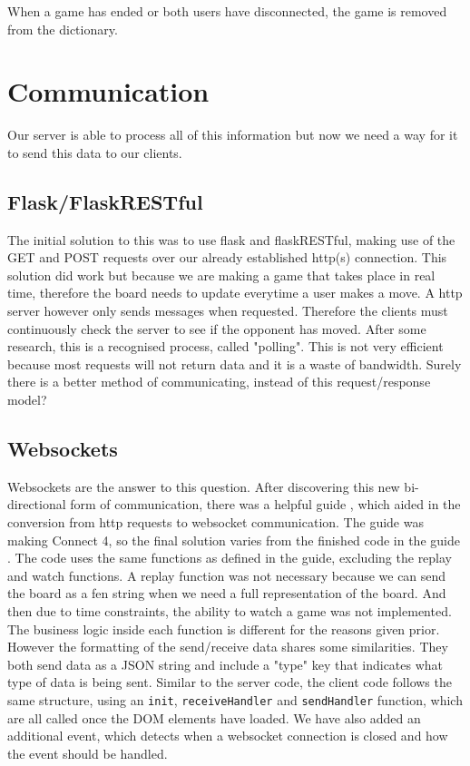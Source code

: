 When a game has ended or both users have disconnected, the game is removed from the dictionary.

\section{Communication}


Our server is able to process all of this information but now we need a way for it to send this data to our clients.

\subsection{Flask/FlaskRESTful}

The initial solution to this was to use flask and flaskRESTful, making use of the GET and POST requests over our already established http(s) connection. This solution did work but because we are making a game that takes place in real time, therefore the board needs to update everytime a user makes a move. A http server however only sends messages when requested. Therefore the clients must continuously check the server to see if the opponent has moved. After some research, this is a recognised process, called "polling". This is not very efficient because most requests will not return data and it is a waste of bandwidth. Surely there is a better method of communicating, instead of this request/response model?

\subsection{Websockets}

Websockets are the answer to this question. After discovering this new bi-directional form of communication, there was a helpful guide \cite{Websockets}, which aided in the conversion from http requests to websocket communication. The guide was making Connect 4, so the final solution varies from the finished code in the guide \cite{CompleteCode}. The code uses the same functions as defined in the guide, excluding the replay and watch functions. A replay function was not necessary because we can send the board as a fen string when we need a full representation of the board. And then due to time constraints, the ability to watch a game was not implemented. The business logic inside each function is different for the reasons given prior. However the formatting of the send/receive data shares some similarities. They both send data as a JSON string and include a "type" key that indicates what type of data is being sent. Similar to the server code, the client code follows the same structure, using an \lstinline{init}, \lstinline{receiveHandler} and \lstinline{sendHandler} function, which are all called once the DOM elements have loaded. We have also added an additional event, which detects when a websocket connection is closed and how the event should be handled.

